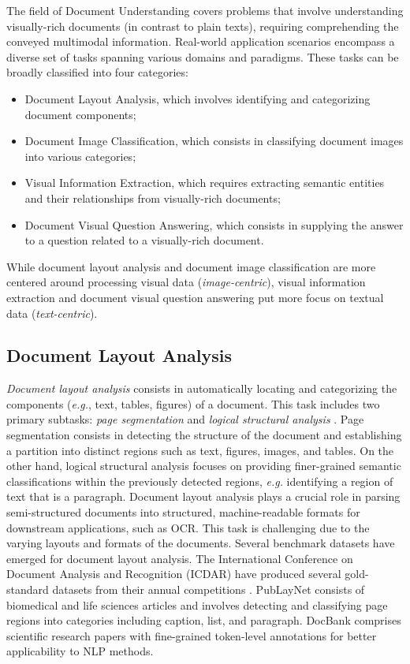 The field of Document Understanding covers problems that involve understanding visually-rich documents (in contrast to plain texts), requiring comprehending the conveyed multimodal information. Real-world application scenarios encompass a diverse set of tasks spanning various domains and paradigms. These tasks can be broadly classified into four categories: 

\begin{itemize}
    \item Document Layout Analysis, which involves identifying and categorizing document components;
    \item Document Image Classification, which consists in classifying document images into various categories;
    \item Visual Information Extraction, which requires extracting semantic entities and their relationships from visually-rich documents;
    \item Document Visual Question Answering, which consists in supplying the answer to a question related to a visually-rich document.
\end{itemize}

While document layout analysis and document image classification are more centered around processing visual data (\textit{image-centric}), visual information extraction and document visual question answering put more focus on textual data (\textit{text-centric}).

\subsection{Document Layout Analysis}

\textit{Document layout analysis} consists in automatically locating and categorizing the components (\textit{e.g.}, text, tables, figures) of a document. This task includes two primary subtasks: \textit{page segmentation} and \textit{logical structural analysis} \citep{binmakhashen2019document}. Page segmentation consists in detecting the structure of the document and establishing a partition into distinct regions such as text, figures, images, and tables. On the other hand, logical structural analysis focuses on providing finer-grained semantic classifications within the previously detected regions, \textit{e.g.} identifying a region of text that is a paragraph. Document layout analysis plays a crucial role in parsing semi-structured documents into structured, machine-readable formats for downstream applications, such as \ac{OCR}. This task is challenging due to the varying layouts and formats of the documents. Several benchmark datasets have emerged for document layout analysis. The International Conference on Document Analysis and Recognition (ICDAR) have produced several gold-standard datasets from their annual competitions \citep{antonacopoulos2013icdar, gao2017icdar2017}. PubLayNet \citep{zhong2019publaynet} consists of biomedical and life sciences articles and involves detecting and classifying page regions into categories including caption, list, and paragraph. 
DocBank \citep{li2020docbank} comprises scientific research papers with fine-grained token-level annotations for better applicability to \ac{NLP} methods.

